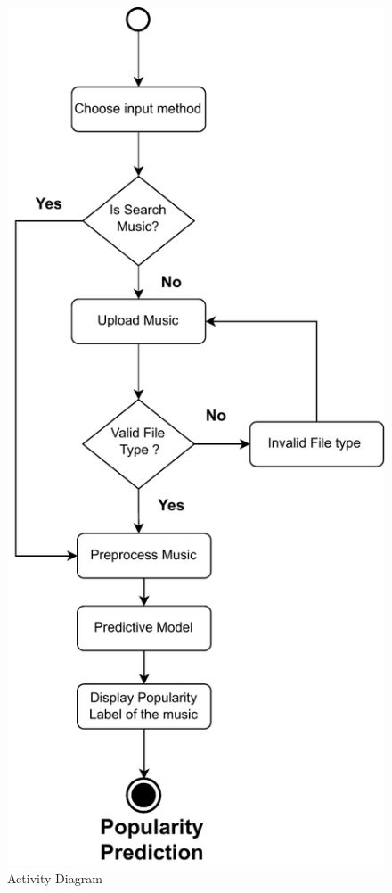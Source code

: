 \documentclass[11pt]{report}
\begin{document}
\begin{figure}[H]
    \centering
    \includegraphics[scale=0.8]{PDF/Activity-main-real.pdf}
    \caption{Activity Diagram}
    \label{fig:activity diagram for Waveform}
\end{figure}
\end{document}
